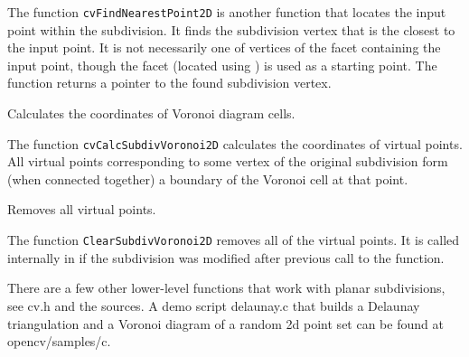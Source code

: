 \begin{description}
\end{description}

The function \texttt{cvFindNearestPoint2D} is another function that
locates the input point within the subdivision. It finds the subdivision vertex that
is the closest to the input point. It is not necessarily one of vertices
of the facet containing the input point, though the facet (located using
) is used as a starting
point. The function returns a pointer to the found subdivision vertex.

\label{CalcSubdivVoronoi2D}

Calculates the coordinates of Voronoi diagram cells.


\begin{description}
\end{description}

The function \texttt{cvCalcSubdivVoronoi2D} calculates the coordinates
of virtual points. All virtual points corresponding to some vertex of the
original subdivision form (when connected together) a boundary of the Voronoi
cell at that point.

\label{ClearSubdivVoronoi2D}

Removes all virtual points.


\begin{description}
\end{description}

The function \texttt{ClearSubdivVoronoi2D} removes all of the virtual points. It
is called internally in  if the subdivision
was modified after previous call to the function.

There are a few other lower-level functions that work with planar
subdivisions, see cv.h and the sources. A demo script delaunay.c that
builds a Delaunay triangulation and a Voronoi diagram of a random 2d point
set can be found at opencv/samples/c.

